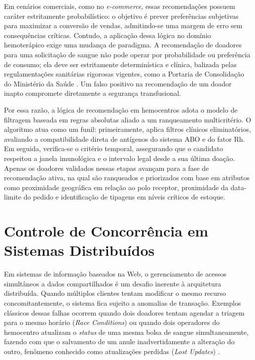 Em cenários comerciais, como no \textit{e-commerce}, essas recomendações possuem caráter estritamente probabilístico: o objetivo é prever preferências subjetivas para maximizar a conversão de vendas, admitindo-se uma margem de erro sem consequências críticas. Contudo, a aplicação dessa lógica no domínio hemoterápico exige uma mudança de paradigma. A recomendação de doadores para uma solicitação de sangue não pode operar por probabilidade ou preferência de consumo; ela deve ser estritamente determinística e clínica, balizada pelas regulamentações sanitárias rigorosas vigentes, como a Portaria de Consolidação do Ministério da Saúde \cite{brasil2017}. Um falso positivo na recomendação de um doador inapto compromete diretamente a segurança transfusional.

Por essa razão, a lógica de recomendação em hemocentros adota o modelo de filtragem baseada em regras absolutas aliado a um ranqueamento multicritério. O algoritmo atua como um funil: primeiramente, aplica filtros clínicos eliminatórios, avaliando a compatibilidade direta de antígenos do sistema ABO e do fator Rh. Em seguida, verifica-se o critério temporal, assegurando que o candidato respeitou a janela imunológica e o intervalo legal desde a sua última doação. Apenas os doadores validados nessas etapas avançam para a fase de recomendação ativa, na qual são ranqueados e priorizados com base em atributos como proximidade geográfica em relação ao polo receptor, proximidade da data-limite do pedido e identificação de tipagens em níveis críticos de estoque.

\section{Controle de Concorrência em Sistemas Distribuídos}
\label{sec:concorrencia}

Em sistemas de informação baseados na Web, o gerenciamento de acessos simultâneos a dados compartilhados é um desafio inerente à arquitetura distribuída. Quando múltiplos clientes tentam modificar o mesmo recurso concomitantemente, o sistema fica sujeito a anomalias de transação. Exemplos clássicos dessas falhas ocorrem quando dois doadores tentam agendar a triagem para o mesmo horário (\textit{Race Conditions}) ou quando dois operadores do hemocentro atualizam o \textit{status} de uma mesma bolsa de sangue simultaneamente, fazendo com que o salvamento de um anule inadvertidamente a alteração do outro, fenômeno conhecido como atualizações perdidas (\textit{Lost Updates}) \cite{kleppmann2017}.

